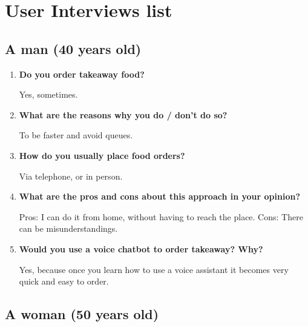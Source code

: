 \section{User Interviews list}


\subsection*{A man (40 years old)}

\begin{enumerate}

\item \textbf{Do you order takeaway food?}

Yes, sometimes.

\item \textbf{What are the reasons why you do / don't do so?}

To be faster and avoid queues.

\item \textbf{How do you usually place food orders?}

Via telephone, or in person.

\item \textbf{What are the pros and cons about this approach in your opinion?}

Pros: I can do it from home, without having to reach the place.
Cons: There can be misunderstandings.

\item \textbf{Would you use a voice chatbot to order takeaway? Why?}

Yes, because once you learn how to use a voice assistant it becomes very quick and easy to order.

\end{enumerate}


\subsection*{A woman (50 years old)}


